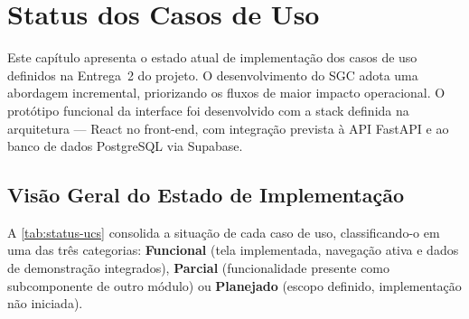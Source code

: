 \chapter{Status dos Casos de Uso}

Este capítulo apresenta o estado atual de implementação dos casos de uso definidos na Entrega~2 do projeto. O desenvolvimento do SGC adota uma abordagem incremental, priorizando os fluxos de maior impacto operacional. O protótipo funcional da interface foi desenvolvido com a stack definida na arquitetura --- React no front-end, com integração prevista à API FastAPI e ao banco de dados PostgreSQL via Supabase.

\section{Visão Geral do Estado de Implementação}

A \autoref{tab:status-ucs} consolida a situação de cada caso de uso, classificando-o em uma das três categorias: \textbf{Funcional} (tela implementada, navegação ativa e dados de demonstração integrados), \textbf{Parcial} (funcionalidade presente como subcomponente de outro módulo) ou \textbf{Planejado} (escopo definido, implementação não iniciada).

